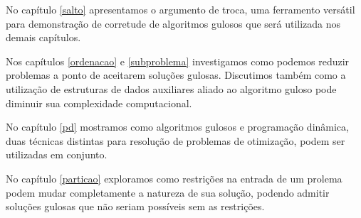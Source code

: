No capítulo \ref{salto} apresentamos o argumento de troca, uma ferramento versátil para demonstração de corretude de algoritmos gulosos que será utilizada nos demais capítulos.

Nos capítulos \ref{ordenacao} e \ref{subproblema} investigamos como podemos reduzir problemas a ponto de aceitarem soluções gulosas. Discutimos também como a utilização de estruturas de dados auxiliares aliado ao algoritmo guloso pode diminuir sua complexidade computacional.

No capítulo \ref{pd} mostramos como algoritmos gulosos e programação dinâmica, duas técnicas distintas para resolução de problemas de otimização, podem ser utilizadas em conjunto.

No capítulo \ref{particao} exploramos como restrições na entrada de um prolema podem mudar completamente a natureza de sua solução, podendo admitir soluções gulosas que não seriam possíveis sem as restrições.
